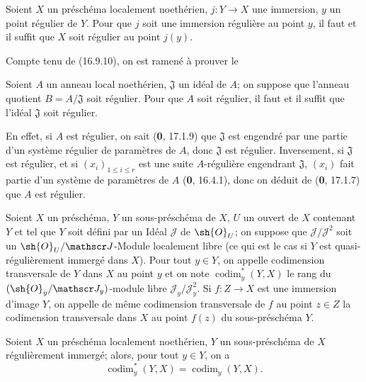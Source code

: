 \begin{proposition}[19.1.1]
\label{IV.19.1.1}
Soient $X$ un préschéma localement noethérien, $j:Y\to X$ une immersion, $y$ un point régulier de $Y$. Pour que $j$ soit une immersion régulière au point $y$, il faut et il suffit que $X$ soit régulier au point $j(y)$.
\end{proposition}

Compte tenu de (16.9.10), on est ramené à prouver le

\begin{corollary}[19.1.2]
Soient $A$ un anneau local noethérien, $\mathfrak J$ un idéal de $A$; on suppose que l'anneau quotient $B=A/\mathfrak J$ soit régulier. Pour que $A$ soit régulier, il faut et il suffit que l'idéal $\mathfrak J$ soit régulier.
\end{corollary}

En effet, si $A$ est régulier, on sait (\textbf{0}, 17.1.9) que $\mathfrak J$ est engendré par une partie d'un système régulier de paramètres de $A$, donc $\mathfrak J$ est régulier. Inversement, si $\mathfrak J$ est régulier, et si $(x_i)_{1\leq i\leq r}$ est une suite $A$-régulière engendrant $\mathfrak J$, $(x_i)$ fait partie d'un système de paramètres de $A$ (\textbf{0}, 16.4.1), donc on déduit de (\textbf{0}, 17.1.7) que $A$ est régulier.

\begin{definition}[19.1.3]
Soient $X$ un préschéma, $Y$ un sous-préschéma de $X$, $U$ un ouvert de $X$ contenant $Y$ et tel que $Y$ soit défini par un Idéal $\mathscr J$ de $\sh{O}_U$; on suppose que $\mathscr J/\mathscr J^2$ soit un $\sh{O}_U/\mathscr J$-Module localement libre \textup{(ce qui est le cas si $Y$ est quasi-régulièrement immergé dans $X$)}. Pour tout $y\in Y$, on appelle codimension transversale de $Y$ dans $X$ au point $y$ et on note $\operatorname{codim}_y^*(Y,X)$ le rang du $(\sh{O}_y/\mathscr J_y)$-module libre $\mathscr J_y/\mathscr J_y^2$. Si $f:Z\to X$ est une immersion d'image $Y$, on appelle de même codimension transversale de $f$ au point $z\in Z$ la codimension transversale dans $X$ au point $f(z)$ du sous-préschéma $Y$.
\end{definition}

\begin{proposition}[19.1.4]
\label{IV.19.1.4}
Soient $X$ un préschéma localement noethérien, $Y$ un sous-préschéma de $X$ régulièrement immergé; alors, pour tout $y\in Y$, on a
\begin{equation}
  \operatorname{codim}_y^*(Y,X)=\operatorname{codim}_y(Y,X).
  \tag{19.1.4.1}\label{IV.19.1.4.1}
\end{equation}
\end{proposition}

